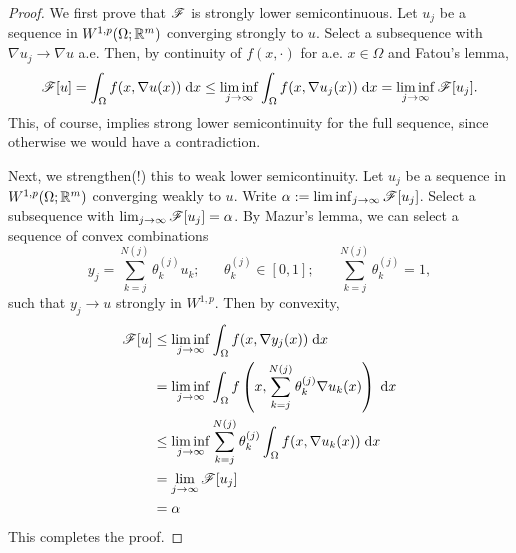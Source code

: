 \begin{proof}
    We first prove that $\mathscr{F}$ is strongly lower semicontinuous. Let $u_j$ be a sequence in $W^{1,p}(\Omega;\mathbb{R}^m)$ converging strongly to $u$. Select a subsequence with $\nabla u_j \rightarrow \nabla u$ a.e. Then, by continuity of $f(x,\cdot)$ for a.e. $x \in \Omega$ and Fatou's lemma,
    \begin{equation}
        \mathscr{F}[u] =    \int_{\Omega} f(x,\nabla u(x)) \; \mathrm{d} x 
                 \leq \liminf_{j \rightarrow \infty} \int_\Omega f(x,\nabla u_j(x)) \; \mathrm{d} x 
                 =    \liminf_{j \rightarrow \infty} \mathscr{F}[u_j].
    \end{equation}
    This, of course, implies strong lower semicontinuity for the full sequence, since otherwise we would have a contradiction.

    Next, we strengthen(!) this to weak lower semicontinuity. Let $u_j$ be a sequence in $W^{1,p}(\Omega;\mathbb{R}^m)$ converging weakly to $u$. Write $\alpha := \liminf_{j \to \infty} \mathscr{F}[u_j]$. Select a subsequence with $\lim_{j \to \infty} \mathscr{F}[u_j] = \alpha$. By Mazur's lemma, we can select a sequence of convex combinations
    \begin{equation}
        y_j = \sum_{k=j}^{N(j)} \theta^{(j)}_k u_k; \hspace{20pt} \theta^{(j)}_k \in [0,1]; \hspace{20pt} \sum_{k=j}^{N(j)} \theta^{(j)}_k = 1,
    \end{equation}
    such that $y_j \rightarrow u$ strongly in $W^{1,p}$. Then by convexity,
    \begin{equation}
        \begin{aligned}
            \mathscr{F}[u] &\leq \liminf_{j \to \infty} \int_\Omega f(x,\nabla y_j(x)) \; \mathrm{d} x                                                 \\
                     &=    \liminf_{j \to \infty} \int_\Omega f\left(x, \sum_{k=j}^{N(j)} \theta^{(j)}_k \nabla u_k(x)\right) \; \mathrm{d} x    \\
                     &\leq \liminf_{j \to \infty} \sum_{k=j}^{N(j)} \theta^{(j)}_k \int_\Omega f(x,\nabla u_k(x)) \; \mathrm{d} x                \\
                     &=    \lim_{j \to \infty} \mathscr{F}[u_j]                                                                                \\
                     &=    \alpha
        \end{aligned}
    \end{equation}
    This completes the proof.
\end{proof}
